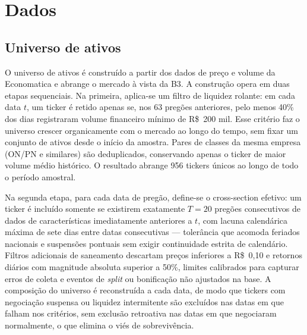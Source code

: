 \section{Dados}
\label{sec:dados}

\subsection{Universo de ativos}
\label{subsec:universo}

O universo de ativos é construído a partir dos dados de preço e volume da Economatica
e abrange o mercado à vista da B3. A construção opera em duas etapas sequenciais. Na
primeira, aplica-se um filtro de liquidez rolante: em cada data $t$, um ticker é
retido apenas se, nos 63 pregões anteriores, pelo menos 40\% dos dias registraram
volume financeiro mínimo de R\$~200 mil. Esse critério faz o universo crescer
organicamente com o mercado ao longo do tempo, sem fixar um conjunto de ativos desde o
início da amostra. Pares de classes da mesma empresa (ON/PN e similares) são
deduplicados, conservando apenas o ticker de maior volume médio histórico. O resultado
abrange 956 tickers únicos ao longo de todo o período amostral.

Na segunda etapa, para cada data de pregão, define-se o cross-section efetivo: um
ticker é incluído somente se existirem exatamente $T = 20$ pregões consecutivos de
dados de características imediatamente anteriores a $t$, com lacuna calendárica máxima
de sete dias entre datas consecutivas --- tolerância que acomoda feriados nacionais e
suspensões pontuais sem exigir continuidade estrita de calendário. Filtros adicionais
de saneamento descartam preços inferiores a R\$~0{,}10 e retornos diários com
magnitude absoluta superior a 50\%, limites calibrados para capturar erros de coleta e
eventos de \textit{split} ou bonificação não ajustados na base. A composição do
universo é reconstruída a cada data, de modo que tickers com negociação suspensa ou
liquidez intermitente são excluídos nas datas em que falham nos critérios, sem
exclusão retroativa nas datas em que negociaram normalmente, o que elimina o viés de
sobrevivência.

